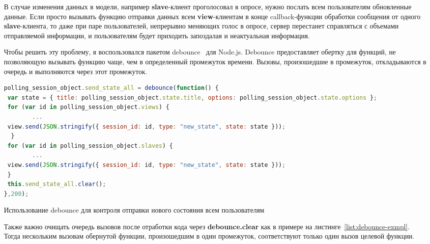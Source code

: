В случае изменения данных в модели, например \textbf{slave}-клиент проголосовал в опросе, нужно послать всем пользователям обновленные данные. Если просто вызывать функцию отправки данных всем \textbf{view}-клиентам в конце callback-функции обработки сообщения от одного \textbf{slave}-клиента, то даже при паре пользователей, непрерывно меняющих голос в опросе, сервер перестанет справляться с объемами отправляемой информации, и пользователям будет приходить запоздалая и неактуальная информация.

Чтобы решить эту проблему, я воспользовался пакетом debounce~\autocite{debounce} для Node.js. Debounce предоставляет обертку для функций, не позволяющую вызывать функцию чаще, чем в определенный промежуток времени. Вызовы, произошедшие в промежуток, откладываются в очередь и выполняются через этот промежуток.
 \begin{ListingEnv}[H]
	\begin{lstlisting}[language=JavaScript]
polling_session_object.send_state_all = debounce(function() {
 var state = { title: polling_session_object.state.title, options: polling_session_object.state.options };
 for (var id in polling_session_object.views) {
		...
 view.send(JSON.stringify({ session_id: id, type: "new_state", state: state }));
  }
 for (var id in polling_session_object.slaves) {
		...
 view.send(JSON.stringify({ session_id: id, type: "new_state", state: state }));
 }
 this.send_state_all.clear();
},200);
\end{lstlisting}
\caption{Использование debounce для контроля отправки нового состояния всем пользователям}
\label{list:debounce-exmpl}
\end{ListingEnv}      

Также важно очищать очередь вызовов после отработки кода через \textbf{debounce.clear} как в примере на листинге~\ref{list:debounce-exmpl}. Тогда нескольким вызовам обернутой функции, произошедшим в один промежуток, соответствуют только один вызов целевой функции.

